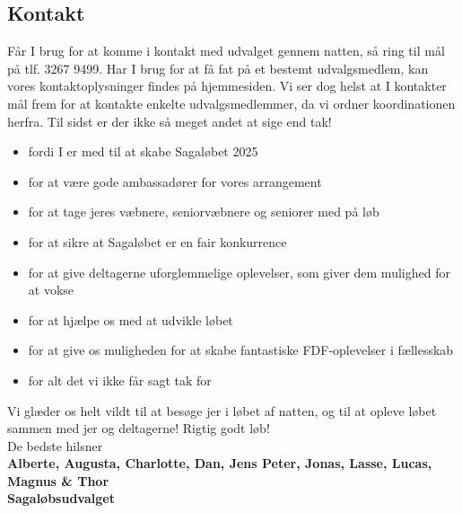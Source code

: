 \subsection{Kontakt}
Får I brug for at komme i kontakt med udvalget gennem natten, så ring til mål på tlf. 3267 9499. Har I brug for at få fat på et bestemt udvalgsmedlem, kan vores kontaktoplysninger findes på hjemmesiden. Vi ser dog helst at I kontakter mål frem for at kontakte enkelte udvalgsmedlemmer, da vi ordner koordinationen herfra.
\newline
Til sidst er der ikke så meget andet at sige end tak!\begin{itemize}
  \item fordi I er med til at skabe Sagaløbet 2025
  \item for at være gode ambassadører for vores arrangement
  \item for at tage jeres væbnere, seniorvæbnere og seniorer med på løb
  \item for at sikre at Sagaløbet er en fair konkurrence
  \item for at give deltagerne uforglemmelige oplevelser, som giver dem mulighed for at vokse
  \item for at hjælpe os med at udvikle løbet
  \item for at give os muligheden for at skabe fantastiske FDF-oplevelser i fællesskab
  \item for alt det vi ikke får sagt tak for
\end{itemize}
Vi glæder os helt vildt til at besøge jer i løbet af natten, og til at opleve løbet sammen med jer og deltagerne!
\newline
Rigtig godt løb!\\
\newline
\textcolor{søblå}{De bedste hilsner}\\
\textcolor{natblå}{\textbf{Alberte, Augusta, Charlotte, Dan, Jens Peter, Jonas, Lasse, Lucas, Magnus \& Thor}}\\
\textcolor{natblå}{\textbf{Sagaløbsudvalget}}\\
\newpage

